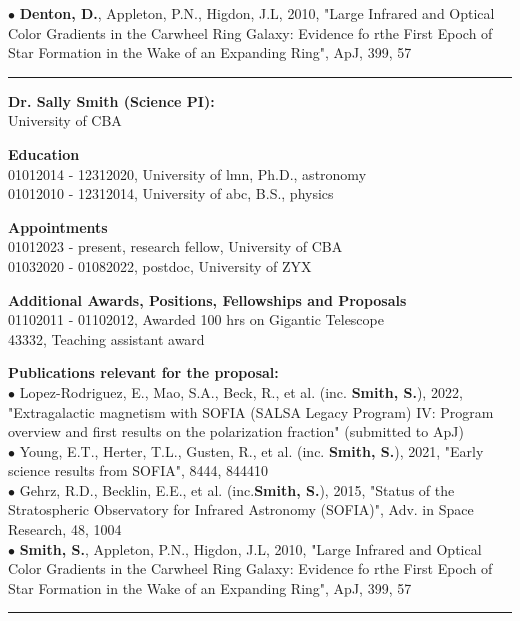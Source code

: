 {\scriptsize{$\bullet$}} \textbf{Denton, D.}, Appleton, P.N., Higdon, J.L, 2010, "Large Infrared and Optical Color Gradients in the Carwheel Ring Galaxy: Evidence fo rthe First Epoch of Star Formation in the Wake of an Expanding Ring", ApJ, 399, 57
\medskip \hrule \vspace{5pt} \medskip
\textbf{\color{Blue}\large Dr. Sally Smith (Science PI):}\\
University of CBA
\par \vspace{-0.5em}
\textbf{Education}\\
01012014 - 12312020, University of lmn, Ph.D., astronomy\\
01012010 - 12312014, University of abc, B.S., physics
\par \vspace{-0.5em}
\textbf{Appointments}\\
01012023 - present, research fellow, University of CBA\\
01032020 - 01082022, postdoc, University of ZYX
\par \vspace{-0.5em}
\textbf{Additional Awards, Positions, Fellowships and Proposals}\\
01102011 - 01102012, Awarded 100 hrs on Gigantic Telescope\\
43332, Teaching assistant award
\par \vspace{-0.5em}
\textbf{Publications relevant for the proposal:}\\
{\scriptsize{$\bullet$}} Lopez-Rodriguez, E., Mao, S.A., Beck, R., et al. (inc. \textbf{Smith, S.}), 2022, "Extragalactic magnetism with SOFIA (SALSA Legacy Program) IV: Program overview and first results on the polarization fraction" (submitted to ApJ)\\
{\scriptsize{$\bullet$}} Young, E.T., Herter, T.L., Gusten, R., et al. (inc. \textbf{Smith, S.}), 2021, "Early science results from SOFIA", 8444, 844410\\
{\scriptsize{$\bullet$}} Gehrz, R.D., Becklin, E.E., et al. (inc.\textbf{Smith, S.}), 2015, "Status of the Stratospheric Observatory for Infrared Astronomy (SOFIA)", Adv. in Space Research, 48, 1004\\
{\scriptsize{$\bullet$}} \textbf{Smith, S.}, Appleton, P.N., Higdon, J.L, 2010, "Large Infrared and Optical Color Gradients in the Carwheel Ring Galaxy: Evidence fo rthe First Epoch of Star Formation in the Wake of an Expanding Ring", ApJ, 399, 57
\medskip \hrule \vspace{5pt} \medskip
